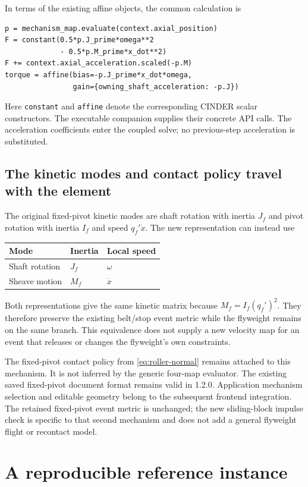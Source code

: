 \documentclass[11pt,letterpaper]{article}
\numberwithin{equation}{section}
\begin{document}
In terms of the existing affine objects, the common calculation is
\begin{lstlisting}
p = mechanism_map.evaluate(context.axial_position)
F = constant(0.5*p.J_prime*omega**2
             - 0.5*p.M_prime*x_dot**2)
F += context.axial_acceleration.scaled(-p.M)
torque = affine(bias=-p.J_prime*x_dot*omega,
                gain={owning_shaft_acceleration: -p.J})
\end{lstlisting}
Here \texttt{constant} and \texttt{affine} denote the corresponding CINDER scalar constructors. The executable companion supplies their concrete API calls. The acceleration coefficients enter the coupled solve; no previous-step acceleration is substituted.

\subsection{The kinetic modes and contact policy travel with the element}

The original fixed-pivot kinetic modes are shaft rotation with inertia $J_f$ and pivot rotation with inertia $I_f$ and speed $q_f'\dot x$. The new representation can instead use
\begin{center}
\begin{tabular}{@{}lll@{}}
\toprule
Mode & Inertia & Local speed\\
\midrule
Shaft rotation & $J_f$ & $\omega$\\
Sheave motion & $M_f$ & $\dot x$\\
\bottomrule
\end{tabular}
\end{center}
Both representations give the same kinetic matrix because $M_f=I_f(q_f')^2$. They therefore preserve the existing belt/stop event metric while the flyweight remains on the same branch. This equivalence does not supply a new velocity map for an event that releases or changes the flyweight's own constraints.

The fixed-pivot contact policy from \cref{eq:roller-normal} remains attached to this mechanism. It is not inferred by the generic four-map evaluator. The existing saved fixed-pivot document format remains valid in 1.2.0. Application mechanism selection and editable geometry belong to the subsequent frontend integration. The retained fixed-pivot event metric is unchanged; the new sliding-block impulse check is specific to that second mechanism and does not add a general flyweight flight or recontact model.

\section{A reproducible reference instance}
\label{sec:fixture}
\end{document}
